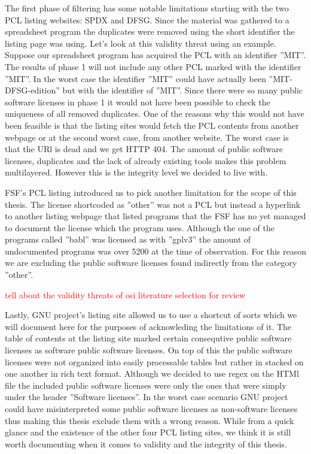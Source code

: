 The first phase of filtering has some notable limitations starting with the two PCL listing websites: SPDX and DFSG. Since the material was gathered to a spreadsheet program the duplicates were removed using the short identifier the listing page was using. Let's look at this validity threat using an example. Suppose our spreadsheet program has acquired the PCL with an identifier ''MIT''. The results of phase 1 will not include any other PCL marked with the identifier ''MIT''. In the worst case the identifier ''MIT'' could have actually been ''MIT-DFSG-edition'' but with the identifier of ''MIT''. Since there were so many public software licenses in phase 1 it would not have been possible to check the uniqueness of all removed duplicates. One of the reasons why this would not have been feasible is that the listing sites would fetch the PCL contents from another webpage or at the second worst case, from another website. The worst case is that the URl is dead and we get HTTP 404. The amount of public software licenses, duplicates and the lack of already existing tools makes this problem multilayered. However this is the integrity level we decided to live with.

FSF's PCL listing introduced us to pick another limitation for the scope of this thesis. The license shortcoded as ''other'' was not a PCL but instead a hyperlink to another listing webpage that listed programs that the FSF has no yet managed to document the license which the program uses. Although the one of the programs called ''babl'' was licensed as with ''gplv3'' the amount of undocumented programs was over 5200 at the time of observation. For this reason we are excluding the public software licenses found indirectly from the category ''other''.

\textcolor{red}{tell about the validity threats of osi literature selection for review}

Lastly, GNU project's listing site allowed us to use a shortcut of sorts which we will document here for the purposes of acknowleding the limitations of it. The table of contents at the listing site marked certain consequtive public software licenses as software public software licenses. On top of this the public software licenses were not organized into easily processable tables but rather in stacked on one another in rich text format. Although we decided to use regex on the HTMl file the included public software licenses were only the ones that were simply under the header ''Software licenses''. In the worst case scenario GNU project could have misinterpreted some public software licenses as non-software licenses thus making this thesis exclude them with a wrong reason. While from a quick glance and the existence of the other four PCL listing sites, we think it is still worth documenting when it comes to validity and the integrity of this thesis.


